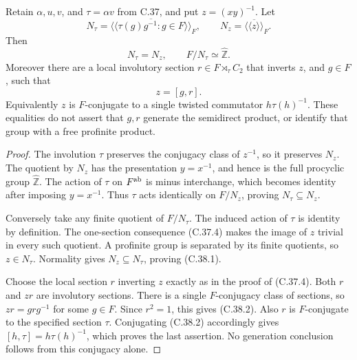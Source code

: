 Retain \(\alpha,u,v\), and \(\tau=\alpha v\) from C.37, and put
\(z=(xy)^{-1}\). Let
\[
 N_\tau=\overline{\langle\!\langle
          \tau(g)g^{-1}:g\in F\rangle\!\rangle}_F,
 \qquad
 N_z=\overline{\langle\!\langle z\rangle\!\rangle}_F .
\]
Then
\[
             N_\tau=N_z,\qquad F/N_\tau\simeq\widehat{\mathbb Z}.
 \tag{C.38.1}
\]
Moreover there are a local involutory section
\(r\in F\rtimes_\tau C_2\) that inverts \(z\), and \(g\in F\),
such that
\[
                              z=[g,r].
 \tag{C.38.2}
\]
Equivalently \(z\) is \(F\)-conjugate to a single twisted
commutator \(h\tau(h)^{-1}\). These equalities do not assert
that \(g,r\) generate the semidirect product, or identify that
group with a free profinite product.

\begin{proof}
The involution \(\tau\) preserves the conjugacy class of
\(z^{-1}\), so it preserves \(N_z\). The quotient by \(N_z\)
has the presentation \(y=x^{-1}\), and hence is the full
procyclic group \(\widehat{\mathbb Z}\). The action of
\(\tau\) on \(F^{\rm ab}\) is minus interchange, which becomes
identity after imposing \(y=x^{-1}\). Thus \(\tau\) acts
identically on \(F/N_z\), proving \(N_\tau\subseteq N_z\).

Conversely take any finite quotient of \(F/N_\tau\).
The induced action of \(\tau\) is identity by definition.
The one-section consequence (C.37.4) makes the image of
\(z\) trivial in every such quotient. A profinite group is
separated by its finite quotients, so \(z\in N_\tau\).
Normality gives \(N_z\subseteq N_\tau\), proving (C.38.1).

Choose the local section \(r\) inverting \(z\) exactly as
in the proof of (C.37.4). Both \(r\) and \(zr\) are
involutory sections. There is a single \(F\)-conjugacy class
of sections, so \(zr=grg^{-1}\) for some \(g\in F\).
Since \(r^2=1\), this gives (C.38.2). Also \(r\) is
\(F\)-conjugate to the specified section \(\tau\).
Conjugating (C.38.2) accordingly gives
\([h,\tau]=h\tau(h)^{-1}\), which proves the last assertion.
No generation conclusion follows from this conjugacy alone.
\end{proof}
